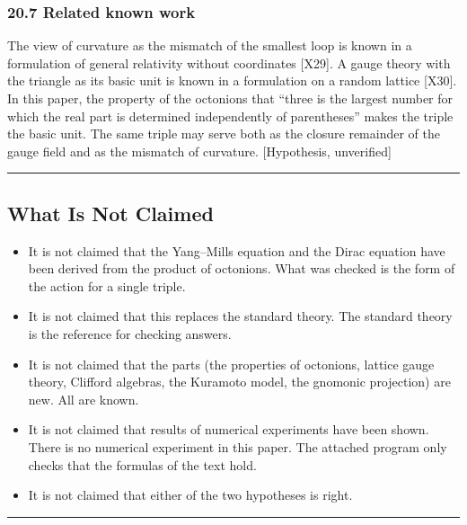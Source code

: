 \documentclass[
  a4paper,
]{article}
\providecommand{\tightlist}{%
  \setlength{\itemsep}{0pt}\setlength{\parskip}{0pt}}
\begin{document}
\subsubsection{20.7 Related known work}\label{related-known-work}

The view of curvature as the mismatch of the smallest loop is known in a
formulation of general relativity without coordinates {[}X29{]}. A gauge
theory with the triangle as its basic unit is known in a formulation on
a random lattice {[}X30{]}. In this paper, the property of the octonions
that ``three is the largest number for which the real part is determined
independently of parentheses'' makes the triple the basic unit. The same
triple may serve both as the closure remainder of the gauge field and as
the mismatch of curvature. {[}Hypothesis, unverified{]}

\begin{center}\rule{0.5\linewidth}{0.5pt}\end{center}

\subsection{What Is Not Claimed}\label{what-is-not-claimed}

\begin{itemize}
\tightlist
\item
  It is not claimed that the Yang--Mills equation and the Dirac equation
  have been derived from the product of octonions. What was checked is
  the form of the action for a single triple.
\item
  It is not claimed that this replaces the standard theory. The standard
  theory is the reference for checking answers.
\item
  It is not claimed that the parts (the properties of octonions, lattice
  gauge theory, Clifford algebras, the Kuramoto model, the gnomonic
  projection) are new. All are known.
\item
  It is not claimed that results of numerical experiments have been
  shown. There is no numerical experiment in this paper. The attached
  program only checks that the formulas of the text hold.
\item
  It is not claimed that either of the two hypotheses is right.
\end{itemize}

\begin{center}\rule{0.5\linewidth}{0.5pt}\end{center}
\end{document}
